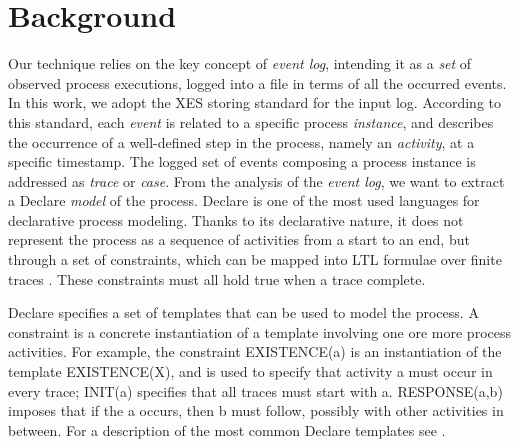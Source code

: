 \documentclass[a4wide,11pt]{article}
\theoremstyle{definition}
\theoremstyle{plain}
\begin{document}



\section{Background}\label{sec:back}

Our technique relies on the key concept of \emph{event log}, intending it as a \emph{set} of observed process executions, logged into a file in terms of all the occurred events.
%
%
In this work, we adopt the \ac{XES} storing standard \cite{XES} for the input log. According to this standard, each \emph{event} is related to a specific process \emph{instance}, and describes the occurrence of a well-defined step in the process, namely an \emph{activity}, at a specific timestamp. The logged set of events composing a process instance is addressed as \emph{trace} or \emph{case}. 
From the analysis of the \emph{event log}, we want to extract a Declare \cite{2008-Pesic,2009-Aalst} \emph{model} of the process.
Declare is one of the most used languages for declarative process modeling. Thanks to its declarative nature, it does not represent the process as a sequence of activities from a start to an end, but through a set of constraints, which can be mapped into \ac{LTL} formulae over finite traces \cite{DBLP:journals/tweb/MontaliPACMS10,DBLP:conf/ijcai/GiacomoV13}. These constraints must all hold true when a trace complete.

Declare specifies a set of templates that can be used to model the process. 
A constraint is a concrete instantiation of a template involving one ore more process activities.
For example, the constraint \textsf{EXISTENCE(a)} is an instantiation of the template \textsf{EXISTENCE(X)}, and is used to specify that activity \textsf{a} must occur in every trace; \textsf{INIT(a)} specifies that all traces must start with \textsf{a}. \textsf{RESPONSE(a,b)} imposes that if the \textsf{a} occurs, then \textsf{b} must follow, possibly with other activities in between. %
For a description of the most common Declare templates see \cite{2008-Pesic}. 
\end{document}

